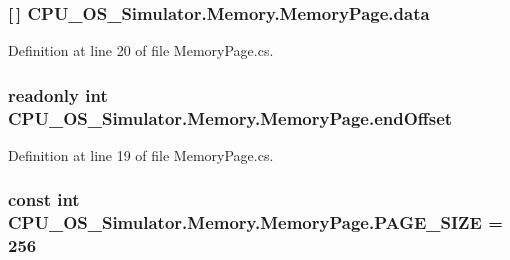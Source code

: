 \subsubsection[{data}]{ \mbox{[}$\,$\mbox{]} C\+P\+U\+\_\+\+O\+S\+\_\+\+Simulator.\+Memory.\+Memory\+Page.\+data\hspace{0.3cm}{\ttfamily [private]}}\label{class_c_p_u___o_s___simulator_1_1_memory_1_1_memory_page_af9ab25101e7920de2344e0fa5ddfaa27}


Definition at line 20 of file Memory\+Page.\+cs.

\hypertarget{class_c_p_u___o_s___simulator_1_1_memory_1_1_memory_page_ae2f8f419909326ce5449d37af9ff7c89}{}
\subsubsection[{end\+Offset}]{\setlength{\rightskip}{0pt plus 5cm}readonly int C\+P\+U\+\_\+\+O\+S\+\_\+\+Simulator.\+Memory.\+Memory\+Page.\+end\+Offset\hspace{0.3cm}{\ttfamily [private]}}\label{class_c_p_u___o_s___simulator_1_1_memory_1_1_memory_page_ae2f8f419909326ce5449d37af9ff7c89}


Definition at line 19 of file Memory\+Page.\+cs.

\hypertarget{class_c_p_u___o_s___simulator_1_1_memory_1_1_memory_page_a502abee83030136a808d5b5f0c0fe7ec}{}
\subsubsection[{P\+A\+G\+E\+\_\+\+S\+I\+Z\+E}]{\setlength{\rightskip}{0pt plus 5cm}const int C\+P\+U\+\_\+\+O\+S\+\_\+\+Simulator.\+Memory.\+Memory\+Page.\+P\+A\+G\+E\+\_\+\+S\+I\+Z\+E = 256}\label{class_c_p_u___o_s___simulator_1_1_memory_1_1_memory_page_a502abee83030136a808d5b5f0c0fe7ec}


